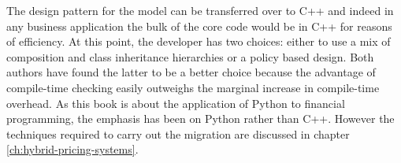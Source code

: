 The design pattern for the model can be transferred over to C++ and
indeed in any business application the bulk of the core code would be
in C++ for reasons of efficiency. At this point, the developer has two
choices: either to use a mix of composition and class inheritance
hierarchies or a policy based design. Both authors have found the
latter to be a better choice because the advantage of compile-time
checking easily outweighs the marginal increase in compile-time
overhead. As this book is about the application of Python to
financial programming, the emphasis has been on Python rather than
C++. However the techniques required to carry out the migration are
discussed in chapter \ref{ch:hybrid-pricing-systems}.

